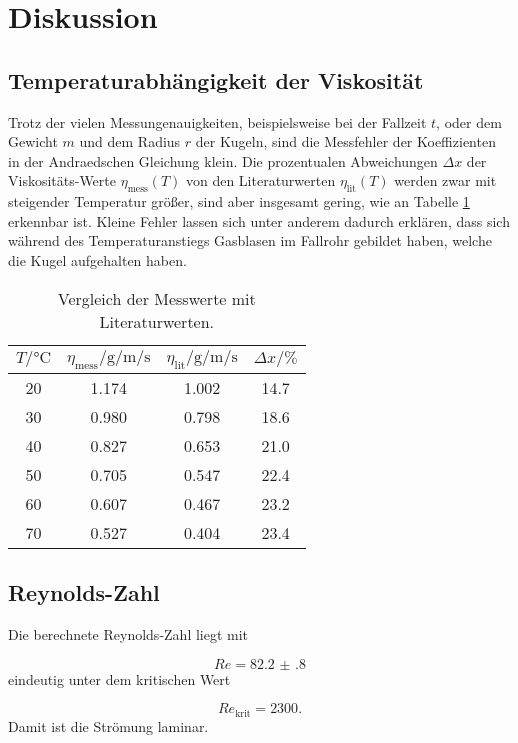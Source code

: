 \section{Diskussion}
\label{sec:Diskussion}

\subsection{Temperaturabhängigkeit der Viskosität}

Trotz der vielen Messungenauigkeiten, beispielsweise bei der Fallzeit $t$, oder
dem Gewicht $m$ und dem Radius $r$ der Kugeln, sind die Messfehler der
Koeffizienten in der Andraedschen Gleichung klein.
Die prozentualen Abweichungen $\Delta x$ der Viskositäts-Werte
$\eta_\text{mess}(T)$ von den
Literaturwerten $\eta_\text{lit}(T)$ \cite{Viskositätliteratur}
werden zwar mit steigender Temperatur größer,
sind aber insgesamt gering,
wie an Tabelle \ref{tab:VglTemperatur} erkennbar ist.
Kleine Fehler lassen sich unter anderem dadurch erklären, dass sich während des
Temperaturanstiegs Gasblasen im Fallrohr gebildet haben, welche die Kugel
aufgehalten haben.

\begin{table}[h]
  \centering
  \caption{Vergleich der Messwerte mit Literaturwerten.}
  \label{tab:VglTemperatur}
  \begin{tabular}{c c c c}
    \toprule
    $T/\si{\celsius}$ & $\eta_\text{mess}/\si{\gram\per\meter\per\second}$ &
    $\eta_\text{lit}/\si{\gram\per\meter\per\second}$ &
    $\Delta x/\si{\percent}$ \\
    \midrule
    20 & 1.174 & 1.002 & 14.7 \\
    30 & 0.980 & 0.798 & 18.6 \\
    40 & 0.827 & 0.653 & 21.0 \\
    50 & 0.705 & 0.547 & 22.4 \\
    60 & 0.607 & 0.467 & 23.2 \\
    70 & 0.527 & 0.404 & 23.4 \\
    \bottomrule
  \end{tabular}
\end{table}


\subsection{Reynolds-Zahl}

Die berechnete Reynolds-Zahl liegt mit

\begin{equation}
  Re = \num{82.2(8)}
\end{equation}
eindeutig unter dem kritischen Wert

\begin{equation}
  Re_\text{krit} = 2300.
\end{equation}
Damit ist die Strömung laminar.
